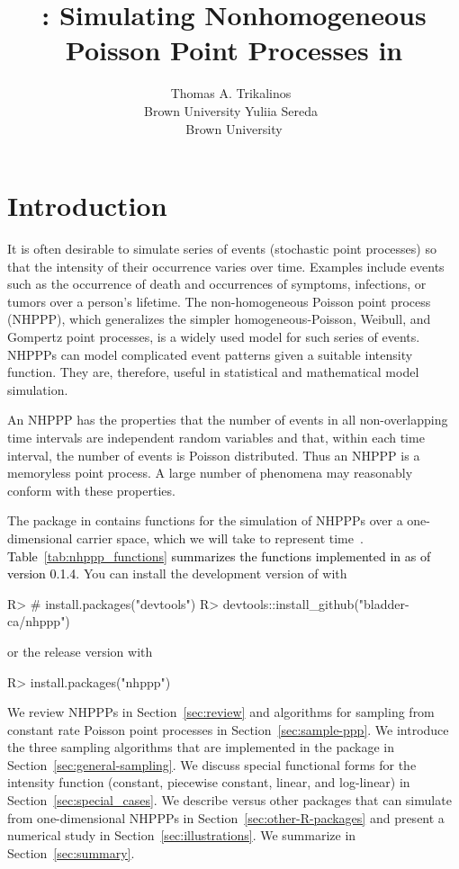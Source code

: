 \documentclass[article,nojss]{jss}\usepackage[]{graphicx}\usepackage[]{xcolor}
\author{Thomas A. Trikalinos~\orcidlink{0000-0002-3990-1848}\\Brown University
   \And Yuliia Sereda~\orcidlink{https://orcid.org/0000-0002-4017-4561}\\Brown University}
\title{\pkg{nhppp}: Simulating Nonhomogeneous Poisson Point Processes in \proglang{R}}
\newcommand{\red}[1]{\textcolor{black}{#1}}
\begin{document}
\section{Introduction} \label{sec:intro}

It is often desirable to simulate series of events (stochastic point processes) so that the intensity of their occurrence varies over time. Examples include events such as the occurrence of death and occurrences of symptoms, infections, or tumors over a person's lifetime. The non-homogeneous Poisson point process (NHPPP), which generalizes the simpler homogeneous-Poisson, Weibull, and Gompertz point processes, is a widely used model for such series of events. NHPPPs can model complicated event patterns given a suitable intensity function. They are, therefore, useful in statistical and mathematical model simulation.

An NHPPP has the properties that the number of events in all non-overlapping time intervals are independent random variables and that, within each time interval, the number of events is Poisson distributed. Thus an NHPPP is a memoryless point process. A large number of phenomena may reasonably conform with these properties.%

The  package in  contains functions for the simulation of NHPPPs over a one-dimensional carrier space, which we will take to represent time~\citep{nhppp-package, trikalinos2024nhppp}. \red{Table~\ref{tab:nhppp_functions} summarizes the functions implemented in \pkg{nhppp} as of version 0.1.4.} You can install the development version of  with
\begin{Schunk}
\begin{Sinput}
R> # install.packages("devtools")
R> devtools::install_github("bladder-ca/nhppp")
\end{Sinput}
\end{Schunk}
or the release version with
\begin{Schunk}
\begin{Sinput}
R> install.packages("nhppp")
\end{Sinput}
\end{Schunk}



We review NHPPPs in Section~\ref{sec:review} and algorithms for sampling from constant rate Poisson point processes in Section~\ref{sec:sample-ppp}. We introduce the three sampling algorithms that are implemented in the package in Section~\ref{sec:general-sampling}. We discuss special functional forms for the intensity function (constant, piecewise constant, linear, and log-linear) in Section~\ref{sec:special_cases}. We describe  versus other  packages that can simulate from one-dimensional NHPPPs in Section~\ref{sec:other-R-packages} and present a numerical study in Section~\ref{sec:illustrations}. We summarize in Section~\ref{sec:summary}.
\end{document}
